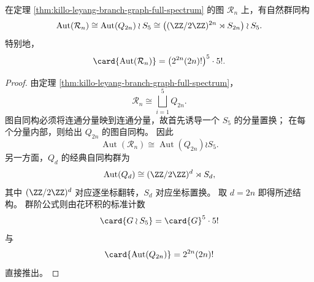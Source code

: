\begin{proposition}\label{prop:killo-leyang-branch-graph-automorphism-wreath}
在定理 \ref{thm:killo-leyang-branch-graph-full-spectrum} 的图 \(\mathcal R_n\) 上，有自然群同构
\[
\operatorname{Aut}(\mathcal R_n)
\cong
\operatorname{Aut}(Q_{2n})\wr S_5
\cong
\bigl((\ZZ/2\ZZ)^{2n}\rtimes S_{2n}\bigr)\wr S_5.
\]
特别地，
\[
\card{\operatorname{Aut}(\mathcal R_n)}
=
\bigl(2^{2n}(2n)!\bigr)^5\cdot 5!.
\]
\end{proposition}
\begin{proof}
由定理 \ref{thm:killo-leyang-branch-graph-full-spectrum}，
\[
\mathcal R_n\cong \bigsqcup_{i=1}^{5}Q_{2n}.
\]
图自同构必须将连通分量映到连通分量，故首先诱导一个 \(S_5\) 的分量置换；
在每个分量内部，则给出 \(Q_{2n}\) 的图自同构。
因此
\[
\operatorname{Aut}(\mathcal R_n)\cong \operatorname{Aut}(Q_{2n})\wr S_5.
\]
另一方面，\(Q_d\) 的经典自同构群为
\[
\operatorname{Aut}(Q_d)\cong (\ZZ/2\ZZ)^d\rtimes S_d,
\]
其中 \((\ZZ/2\ZZ)^d\) 对应逐坐标翻转，\(S_d\) 对应坐标置换。
取 \(d=2n\) 即得所述结构。
群阶公式则由花环积的标准计数
\[
\card{G\wr S_5}=\card{G}^5\cdot 5!
\]
与
\[
\card{\operatorname{Aut}(Q_{2n})}=2^{2n}(2n)!
\]
直接推出。
\end{proof}

\endinput
